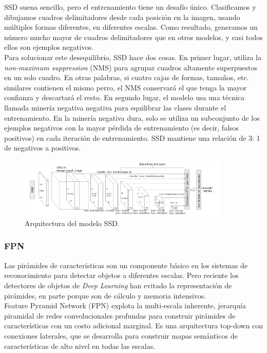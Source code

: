 \documentclass{bmvc2k}
\begin{document}
SSD suena sencillo, pero el entrenamiento tiene un desafío único. Clasificamos y dibujamos cuadros delimitadores desde cada posición en la imagen, usando múltiples formas diferentes, en diferentes escalas. Como resultado, generamos un número mucho mayor de cuadros delimitadores que en otros modelos, y casi todos ellos son ejemplos negativos.\\

Para solucionar este desequilibrio, SSD hace dos cosas. En primer lugar, utiliza la \textit{non-maximum suppression} (NMS) para agrupar cuadros altamente superpuestos en un solo cuadro. En otras palabras, si cuatro cajas de formas, tamaños, etc. similares contienen el mismo perro, el NMS conservará el que tenga la mayor confianza y descartará el resto. En segundo lugar, el modelo usa una técnica llamada minería negativa negativa para equilibrar las clases durante el entrenamiento. En la minería negativa dura, solo se utiliza un subconjunto de los ejemplos negativos con la mayor pérdida de entrenamiento (es decir, falsos positivos) en cada iteración de entrenamiento. SSD mantiene una relación de 3: 1 de negativos a positivos.\\

\begin{figure}
\begin{center}
	\includegraphics[width=0.9\textwidth]{images/ssd.png}
   \caption{Arquitectura del modelo SSD.}
	\label{fig.ssd}
\end{center}
\end{figure}

\subsubsection{FPN}

Las pirámides de características son un componente básico en los sistemas de reconocimiento para detectar objetos a diferentes escalas. Pero reciente los detectores de objetos de \textit{Deep Learning} han evitado la representación de pirámides, en parte porque son de cálculo y memoria intensivos. \\

Feature Pyramid Network (FPN) explota la multi-escala inherente, jerarquía piramidal de redes convolucionales profundas para construir pirámides de características con un costo adicional marginal. Es una arquitectura top-down con conexiones laterales, que se desarrolla para construir mapas semánticos de características de alto nivel en todas las escalas.\\
\end{document}

